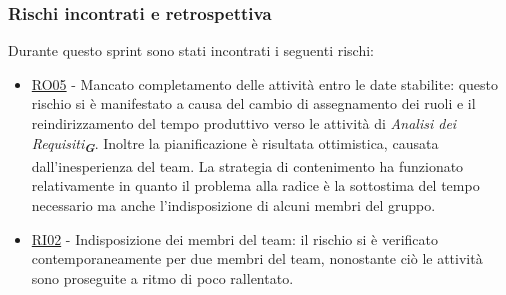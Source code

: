 \documentclass[a4paper,12pt]{article}
\newcommand{\glossario}[1]{\textit{#1}\textsubscript{\textbf{\textit{\textcolor{lightblack}{G}}}}}
\begin{document}
\subsubsection{Rischi incontrati e retrospettiva}
Durante questo sprint sono stati incontrati i seguenti rischi:
\begin{itemize}
    \item \hyperref[RO05]{RO05} - Mancato completamento delle attività entro le date stabilite: questo rischio si è manifestato a causa del cambio di assegnamento dei ruoli e il reindirizzamento del tempo produttivo verso le attività di \glossario{Analisi dei Requisiti}. Inoltre la pianificazione è risultata ottimistica, causata dall'inesperienza del team. La strategia di contenimento ha funzionato relativamente in quanto il problema alla radice è la sottostima del tempo necessario ma anche l'indisposizione di alcuni membri del gruppo.
    \item \hyperref[RI02]{RI02} - Indisposizione dei membri del team: il rischio si è verificato contemporaneamente per due membri del team, nonostante ciò le attività sono proseguite a ritmo di poco rallentato.
\end{itemize}
\end{document}
